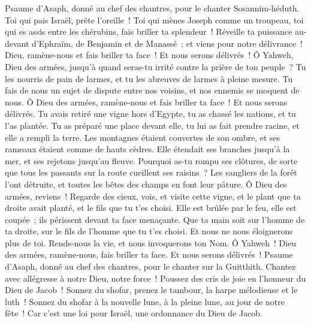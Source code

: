 \begin{multicols}{2}
\VerseOne{}Psaume d'Asaph, donné au chef des chantres, pour le chanter Sosannim-héduth.
Toi qui pais Israël, prête l'oreille~! Toi qui mènes Joseph comme un troupeau, toi qui es assis entre les chérubins, fais briller ta splendeur~!
Réveille ta puissance au-devant d'Ephraïm, de Benjamin et de Manassé~; et viens pour notre délivrance~!
Dieu, ramène-nous et fais briller ta face~! Et nous serons délivrés~!
Ô Yahweh, Dieu des armées, jusqu'à quand seras-tu irrité contre la prière de ton peuple~?
Tu les nourris de pain de larmes, et tu les abreuves de larmes à pleine mesure.
Tu fais de nous un sujet de dispute entre nos voisins, et nos ennemis se moquent de nous.
Ô Dieu des armées, ramène-nous et fais briller ta face~! Et nous serons délivrés.
Tu avais retiré une vigne hors d'Egypte, tu as chassé les nations, et tu l'as plantée.
Tu as préparé une place devant elle, tu lui as fait prendre racine, et elle a rempli la terre.
Les montagnes étaient couvertes de son ombre, et ses rameaux étaient comme de hauts cèdres.
Elle étendait ses branches jusqu'à la mer, et ses rejetons jusqu'au fleuve.
Pourquoi as-tu rompu ses clôtures, de sorte que tous les passants sur la route cueillent ses raisins~?
Les sangliers de la forêt l'ont détruite, et toutes les bêtes des champs en font leur pâture.
Ô Dieu des armées, reviens~! Regarde des cieux, vois, et visite cette vigne,
et le plant que ta droite avait planté, et le fils que tu t'es choisi.
Elle est brûlée par le feu, elle est coupée~; ils périssent devant ta face menaçante.
Que ta main soit sur l'homme de ta droite, sur le fils de l'homme que tu t'es choisi.
Et nous ne nous éloignerons plus de toi. Rends-nous la vie, et nous invoquerons ton Nom.
Ô Yahweh~! Dieu des armées, ramène-nous, fais briller ta face. Et nous serons délivrés~!
\VerseOne{}Psaume d'Asaph, donné au chef des chantres, pour le chanter sur la Guitthith.
Chantez avec allégresse à notre Dieu, notre force~! Poussez des cris de joie en l'honneur du Dieu de Jacob~!
Sonnez du shofar, prenez le tambour, la harpe mélodieuse et le luth~!
Sonnez du shofar à la nouvelle lune, à la pleine lune, au jour de notre fête~!
Car c'est une loi pour Israël, une ordonnance du Dieu de Jacob.

\end{multicols}
